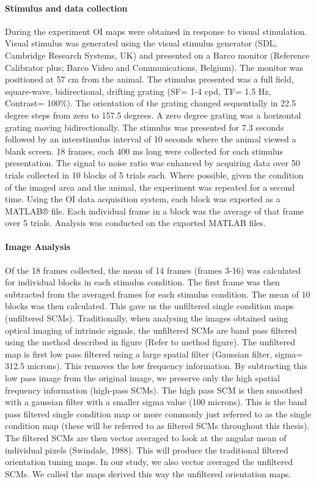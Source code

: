 		\paragraph{Stimulus and data collection}
		
		During the experiment OI maps were obtained in response to visual stimulation. Visual stimulus was generated using the visual stimulus generator (SDL, Cambridge Research Systems, UK) and presented on a Barco monitor (Reference Calibrator plus; Barco Video and Communications, Belgium).  The monitor was positioned at 57 cm from the animal. The stimulus presented was a full field, square-wave, bidirectional, drifting grating (SF= 1-4 cpd, TF= 1.5 Hz, Contrast= 100\%). The orientation of the grating changed sequentially in 22.5 degree steps from zero to 157.5 degrees. A zero degree grating was a horizontal grating moving bidirectionally. The stimulus was presented for 7.3 seconds followed by an interstimulus interval of 10 seconds where the animal viewed a blank screen. 18 frames, each 400 ms long were collected for each stimulus presentation. The signal to noise ratio was enhanced by acquiring data over 50 trials collected in 10 blocks of 5 trials each. Where possible, given the condition of the imaged area and the animal, the experiment was repeated for a second time. Using the OI data acquisition system, each block was exported as a MATLAB® file. Each individual frame in a block was the average of that frame over 5 trials. Analysis was conducted on the exported MATLAB files.
		
		\paragraph{Image Analysis}
		
		Of the 18 frames collected, the mean of 14 frames (frames 3-16) was calculated for individual blocks in each stimulus condition. The first frame was then subtracted from the averaged frames for each stimulus condition. The mean of 10 blocks was then calculated. This gave us the unfiltered single condition maps (unfiltered SCMs). Traditionally, when analysing the images obtained using optical imaging of intrinsic signals, the unfiltered SCMs are band pass filtered using the method described in figure (Refer to method figure). The unfiltered map is first low pass filtered using a large spatial filter (Gaussian filter, sigma= 312.5 microns). This removes the low frequency information. By subtracting this low pass image from the original image, we preserve only the high spatial frequency information (high-pass SCMs). The high pass SCM is then smoothed with a gaussian filter with a smaller sigma value (100 microns). This is the band pass filtered single condition map or more commonly just referred to as the single condition map (these will be referred to as filtered SCMs throughout this thesis). The filtered SCMs are then vector averaged to look at the angular mean of individual pixels (Swindale, 1988). This will produce the traditional filtered orientation tuning maps. In our study, we also vector averaged the unfiltered SCMs. We called the maps derived this way the unfiltered orientation maps.
		
